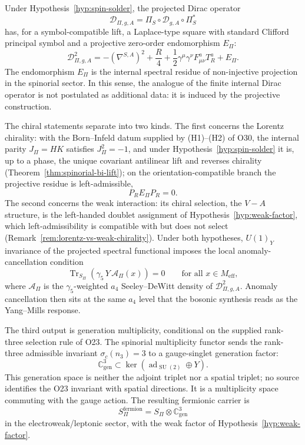 \documentclass[11pt,a4paper]{article}
\theoremstyle{definition}
\theoremstyle{remark}
\newcommand{\SU}{\operatorname{SU}}
\begin{document}
  Under Hypothesis~\ref{hyp:spin-solder}, the projected Dirac operator
  \[
    \mathcal{D}_{\Pi,g,A}
    =
    \Pi_S \circ \mathcal{D}_{g,A} \circ \Pi_S^*
  \]
  has, for a symbol-compatible lift, a Laplace-type square with standard Clifford principal symbol and a
  projective zero-order endomorphism $E_\Pi$:
  \[
    \mathcal{D}_{\Pi,g,A}^2
    =
    -(\nabla^{S,A})^2
    +
    \frac{R}{4}
    +
    \frac{1}{2} \gamma^\mu\gamma^\nu F^a_{\mu\nu}T^a_R
    +
    E_\Pi .
  \]
  The endomorphism $E_\Pi$ is the internal spectral residue of non-injective projection in the spinorial
  sector.
  In this sense, the analogue of the finite internal Dirac operator is not postulated as additional data:
  it is induced by the projective construction.

  The chiral statements separate into two kinds.
  The first concerns the Lorentz chirality: with the Born--Infeld datum supplied by (H1)--(H2) of O30,
  the internal parity $J_\Pi = HK$ satisfies $J_\Pi^2 = -1$, and under Hypothesis~\ref{hyp:spin-solder}
  it is, up to a phase, the unique covariant antilinear lift and reverses chirality
  (Theorem~\ref{thm:spinorial-bi-lift}); on the orientation-compatible branch the projective residue is
  left-admissible,
  \[
    P_R E_\Pi P_R = 0 .
  \]
  The second concerns the weak interaction: its chiral selection, the $V{-}A$ structure, is the
  left-handed doublet assignment of Hypothesis~\ref{hyp:weak-factor}, which left-admissibility is
  compatible with but does not select (Remark~\ref{rem:lorentz-vs-weak-chirality}).
  Under both hypotheses, $U(1)_Y$ invariance of the projected spectral functional imposes the local
  anomaly-cancellation condition
  \[
    \operatorname{Tr}_{S_\Pi}
    \!\left(
        \gamma_5\,Y\,\mathcal{A}_\Pi(x)
    \right)
    =
    0
    \qquad
    \text{for all } x\in M_{\mathrm{eff}} ,
  \]
  where $\mathcal{A}_\Pi$ is the $\gamma_5$-weighted $a_4$ Seeley--DeWitt density
  of $\mathcal{D}_{\Pi,g,A}^2$.
  Anomaly cancellation then sits at the same $a_4$ level that the bosonic synthesis reads as the
  Yang--Mills response.

  The third output is generation multiplicity, conditional on the supplied rank-three
  selection rule of O23.
  The spinorial multiplicity functor sends the rank-three admissible invariant $\sigma_c(n_3)=3$ to a
  gauge-singlet generation factor:
  \[
    \mathbb{C}^3_{\mathrm{gen}}
    \subset
    \ker\!\left(\operatorname{ad}_{\SU(2)}\oplus Y\right).
  \]
  This generation space is neither the adjoint triplet nor a spatial triplet; no source identifies the
  O23 invariant with spatial directions.
  It is a multiplicity space commuting with the gauge action.
  The resulting fermionic carrier is
  \[
    S_\Pi^{\mathrm{fermion}}
    =
    S_\Pi \otimes \mathbb{C}^3_{\mathrm{gen}}
  \]
  in the electroweak/leptonic sector, with the weak factor of Hypothesis~\ref{hyp:weak-factor}.
\end{document}
